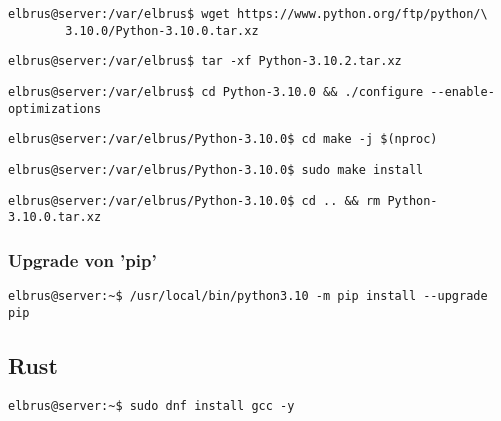 \documentclass{article}
\begin{document}
	\lstset{style=commands}
	\begin{lstlisting}[caption={Herunterladen der Source Datei.}]
		elbrus@server:/var/elbrus$ wget https://www.python.org/ftp/python/\
		3.10.0/Python-3.10.0.tar.xz
	\end{lstlisting}
	
	\lstset{style=commands}
	\begin{lstlisting}[caption={Extrahieren der installierten Datei.}]
		elbrus@server:/var/elbrus$ tar -xf Python-3.10.2.tar.xz
	\end{lstlisting}
	
	\lstset{style=commands}
	\begin{lstlisting}[caption={Wechseln zu source Verzeichniss. Und ausführen des Konfigurations Scripts.}]
		elbrus@server:/var/elbrus$ cd Python-3.10.0 && ./configure --enable-optimizations
	\end{lstlisting}

	\lstset{style=commands}
	\begin{lstlisting}[caption={Starten des build Prozesses.}]
		elbrus@server:/var/elbrus/Python-3.10.0$ cd make -j $(nproc)
	\end{lstlisting}
	
	\lstset{style=commands}
	\begin{lstlisting}[caption={Installieren von Python.}]
		elbrus@server:/var/elbrus/Python-3.10.0$ sudo make install
	\end{lstlisting}

	\lstset{style=commands}
	\begin{lstlisting}[caption={Löschen der kompremierten Python Datei.}]
		elbrus@server:/var/elbrus/Python-3.10.0$ cd .. && rm Python-3.10.0.tar.xz
	\end{lstlisting}

	\subsubsection{Upgrade von 'pip'}

	\lstset{style=commands}
	\begin{lstlisting}[caption={Upgraden von 'pip'.}]
		elbrus@server:~$ /usr/local/bin/python3.10 -m pip install --upgrade pip
	\end{lstlisting}

	\subsection{Rust}
	
	\lstset{style=commands}
	\begin{lstlisting}[caption={Installieren von GNU Compiler Collection.}]
		elbrus@server:~$ sudo dnf install gcc -y
	\end{lstlisting}
	
\end{document}
